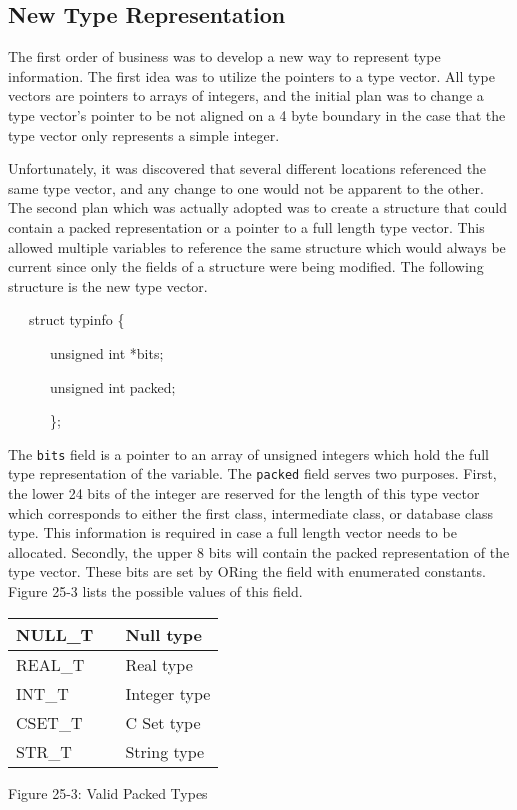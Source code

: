 \subsection{New Type Representation}

The first order of business was to develop a new way to represent type
information. The first idea was to utilize the pointers to a type
vector. All type vectors are pointers to arrays of integers, and the
initial plan was to change a type vector's pointer to be not aligned
on a 4 byte boundary in the case that the type vector only represents
a simple integer.

Unfortunately, it was discovered that several different locations
referenced the same type vector, and any change to one would not be
apparent to the other. The second plan which was actually adopted was
to create a structure that could contain a packed representation or a
pointer to a full length type vector. This allowed multiple variables
to reference the same structure which would always be current since
only the fields of a structure were being modified.  The following
structure is the new type vector.

{\ttfamily\mdseries
\ \ \ struct typinfo \{}

{\ttfamily\mdseries
\ \ \ \ \ \ unsigned int *bits;}

{\ttfamily\mdseries
\ \ \ \ \ \ unsigned int packed;}

{\ttfamily\mdseries
\ \ \ \ \ \ \};}


The \texttt{bits} field is a pointer to an array of unsigned integers
which hold the full type representation of the variable. The
\texttt{packed} field serves two purposes. First, the lower 24 bits of
the integer are reserved for the length of this type vector which
corresponds to either the first class, intermediate class, or database
class type. This information is required in case a full length vector
needs to be allocated. Secondly, the upper 8 bits will contain the
packed representation of the type vector. These bits are set by ORing
the field with enumerated constants. Figure 25-3 lists the possible
values of this field.

\begin{center}
\tabletail{}
\tablelasttail{}
\begin{supertabular}{|m{0.6629598in}|m{0.42545983in}|m{0.8122598in}|}
\hline
 NULL\_T &
 &
 Null type\\\hline
 REAL\_T &
 &
 Real type\\\hline
 INT\_T &
 &
 Integer type\\\hline
 CSET\_T &
 &
 C Set type\\\hline
 STR\_T &
 &
 String type\\\hline
\end{supertabular}
\end{center}
{\centering{}
Figure 25-3: Valid Packed Types
\par}

